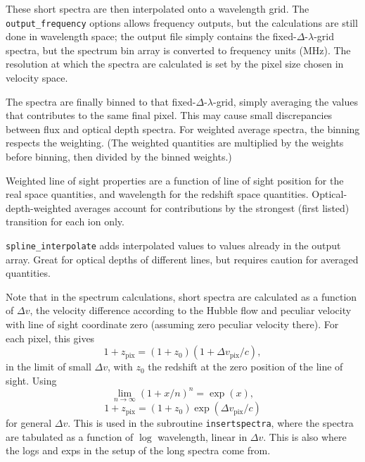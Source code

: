 \documentclass{report}
\newcommand{\param}[1]{{\tt #1}}
\begin{document}
These short spectra are then interpolated onto a wavelength grid. The \param{output\_frequency} options allows frequency outputs, but the calculations are still done in wavelength space; the output file simply contains the fixed-$\Delta$-$\lambda$-grid spectra, but the spectrum bin array is converted to frequency units (MHz). The resolution at which the spectra are calculated is set by the pixel size chosen in velocity space.

The spectra are finally binned to that fixed-$\Delta$-$\lambda$-grid, simply averaging the values that contributes to the same final pixel. This may cause small discrepancies between flux and optical depth spectra. For weighted average spectra, the binning respects the weighting. (The weighted quantities are multiplied by the weights before binning, then divided by the binned weights.)

Weighted line of sight properties are a function of line of sight position for the real space quantities, and wavelength for the redshift space quantities. Optical-depth-weighted averages account for contributions by the strongest (first listed) transition for each ion only.

\param{spline\_interpolate} adds interpolated values to values already in the output array. Great for optical depths of different lines, but requires caution for averaged quantities.  

Note that in the spectrum calculations, short spectra are calculated as a function of $\Delta v$, the velocity difference according to the Hubble flow and peculiar velocity with line of sight coordinate zero (assuming zero peculiar velocity there).
For each pixel, this gives 
\begin{equation}
1 + z_{\mathrm{pix}} = (1 + z_{0}) (1 + \Delta v_{\mathrm{pix}} / c),
\end{equation}
in the limit of small $\Delta v$, with $z_{0}$ the redshift at the zero position of the line of sight. Using 
\begin{equation}
\lim_{n \rightarrow \infty} \left(1 + x/n \right)^{n} = \exp(x),
\end{equation}  
\begin{equation}
1 + z_{\mathrm{pix}} = (1 + z_{0}) \exp(\Delta v_{\mathrm{pix}} / c)
\end{equation}
for general $\Delta v$. This is used in the subroutine \param{insertspectra}, where the spectra are tabulated as a function of $\log$ wavelength, linear in $\Delta v$. This is also where the logs and exps in the setup of the long spectra come from.
\end{document}

